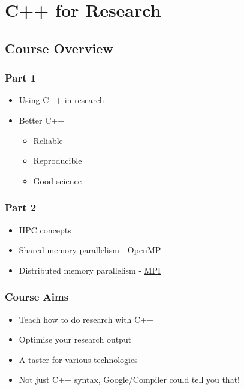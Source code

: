 \section{C++ for Research}\label{c-for-research}

\subsection{Course Overview}\label{course-overview}

\subsubsection{Part 1}\label{part-1}

\begin{itemize}
\itemsep1pt\parskip0pt
\item
  Using C++ in research
\item
  Better C++

  \begin{itemize}
  \itemsep1pt\parskip0pt
  \item
    Reliable
  \item
    Reproducible
  \item
    Good science
  \end{itemize}
\end{itemize}

\subsubsection{Part 2}\label{part-2}

\begin{itemize}
\itemsep1pt\parskip0pt
\item
  HPC concepts
\item
  Shared memory parallelism - \href{http://www.openmp.org}{OpenMP}
\item
  Distributed memory parallelism - \href{http://www.open-mpi.org}{MPI}
\end{itemize}

\subsubsection{Course Aims}\label{course-aims}

\begin{itemize}
\itemsep1pt\parskip0pt
\item
  Teach how to do research with C++
\item
  Optimise your research output
\item
  A taster for various technologies
\item
  Not just C++ syntax, Google/Compiler could tell you that!
\end{itemize}

